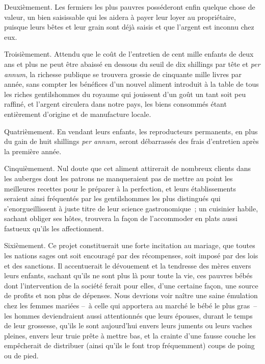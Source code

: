 \documentclass[french,twoside]{book} %
\begin{document}
Deuxièmement. Les fermiers les plus pauvres posséderont enfin quelque chose de valeur, un bien saisissable qui les aidera à payer leur loyer au propriétaire, puisque leurs bêtes et leur grain sont déjà saisis et que l’argent est inconnu chez eux.\par
Troisièmement. Attendu que le coût de l’entretien de cent mille enfants de deux ans et plus ne peut être abaissé en dessous du seuil de dix shillings par tête et \emph{per annum}, la richesse publique se trouvera grossie de cinquante mille livres par année, sans compter les bénéfices d’un nouvel aliment introduit à la table de tous les riches gentilshommes du royaume qui jouissent d’un goût un tant soit peu raffiné, et l’argent circulera dans notre pays, les biens consommés étant entièrement d’origine et de manufacture locale.\par
Quatrièmement. En vendant leurs enfants, les reproducteurs permanents, en plus du gain de huit shillings \emph{per annum}, seront débarrassés des frais d’entretien après la première année.\par
Cinquièmement. Nul doute que cet aliment attirerait de nombreux clients dans les auberges dont les patrons ne manqueraient pas de mettre au point les meilleures recettes pour le préparer à la perfection, et leurs établissements seraient ainsi fréquentés par les gentilshommes les plus distingués qui s’enorgueillissent à juste titre de leur science gastronomique ; un cuisinier habile, sachant obliger ses hôtes, trouvera la façon de l’accommoder en plats aussi fastueux qu’ils les affectionnent.\par
Sixièmement. Ce projet constituerait une forte incitation au mariage, que toutes les nations sages ont soit encouragé par des récompenses, soit imposé par des lois et des sanctions. Il accentuerait le dévouement et la tendresse des mères envers leurs enfants, sachant qu’ils ne sont plus là pour toute la vie, ces pauvres bébés dont l’intervention de la société ferait pour elles, d’une certaine façon, une source de profits et non plus de dépenses. Nous devrions voir naître une saine émulation chez les femmes mariées – à celle qui apportera au marché le bébé le plus gras – les hommes deviendraient aussi attentionnés que leurs épouses, durant le temps de leur grossesse, qu’ils le sont aujourd’hui envers leurs juments ou leurs vaches pleines, envers leur truie prête à mettre bas, et la crainte d’une fausse couche les empêcherait de distribuer (ainsi qu’ils le font trop fréquemment) coups de poing ou de pied.\par
\end{document}
